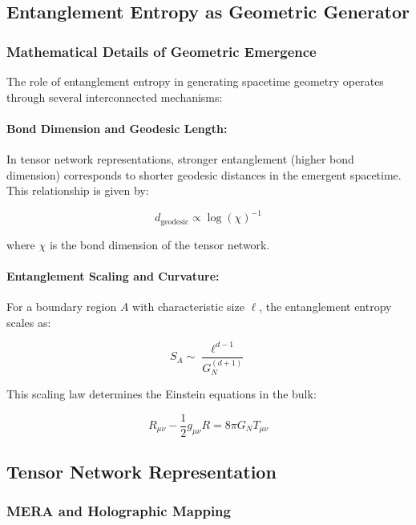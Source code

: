 \documentclass[12pt,a4paper]{article}
\begin{document}
\subsection{Entanglement Entropy as Geometric Generator}

\subsubsection{Mathematical Details of Geometric Emergence}

The role of entanglement entropy in generating spacetime geometry operates through several interconnected mechanisms:

\paragraph{Bond Dimension and Geodesic Length:} In tensor network representations, stronger entanglement (higher bond dimension) corresponds to shorter geodesic distances in the emergent spacetime. This relationship is given by:

\begin{equation}
    d_{\text{geodesic}} \propto \log(\chi)^{-1}
\end{equation}

where $\chi$ is the bond dimension of the tensor network.

\paragraph{Entanglement Scaling and Curvature:} For a boundary region $A$ with characteristic size $\ell$, the entanglement entropy scales as:

\begin{equation}
    S_A \sim \frac{\ell^{d-1}}{G_N^{(d+1)}}
\end{equation}

This scaling law determines the Einstein equations in the bulk:

\begin{equation}
    R_{\mu\nu} - \frac{1}{2}g_{\mu\nu}R = 8\pi G_N T_{\mu\nu}
\end{equation}

\subsection{Tensor Network Representation}

\subsubsection{MERA and Holographic Mapping}
\end{document}
